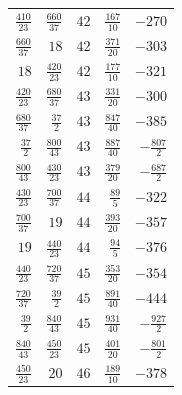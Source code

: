 {\begin{longtable}{@{\extracolsep{\fill}}rrrrr}
$\frac{410}{23}$ & $\frac{660}{37}$ & $42$ & $\frac{167}{10}$ & $-270$ \\
$\frac{660}{37}$ & $18$ & $42$ & $\frac{371}{20}$ & $-303$ \\
$18$ & $\frac{420}{23}$ & $42$ & $\frac{177}{10}$ & $-321$ \\
$\frac{420}{23}$ & $\frac{680}{37}$ & $43$ & $\frac{331}{20}$ & $-300$ \\
$\frac{680}{37}$ & $\frac{37}{2}$ & $43$ & $\frac{847}{40}$ & $-385$ \\
$\frac{37}{2}$ & $\frac{800}{43}$ & $43$ & $\frac{887}{40}$ & $-\frac{807}{2}$ \\
$\frac{800}{43}$ & $\frac{430}{23}$ & $43$ & $\frac{379}{20}$ & $-\frac{687}{2}$ \\
$\frac{430}{23}$ & $\frac{700}{37}$ & $44$ & $\frac{89}{5}$ & $-322$ \\
$\frac{700}{37}$ & $19$ & $44$ & $\frac{393}{20}$ & $-357$ \\
$19$ & $\frac{440}{23}$ & $44$ & $\frac{94}{5}$ & $-376$ \\
$\frac{440}{23}$ & $\frac{720}{37}$ & $45$ & $\frac{353}{20}$ & $-354$ \\
$\frac{720}{37}$ & $\frac{39}{2}$ & $45$ & $\frac{891}{40}$ & $-444$ \\
$\frac{39}{2}$ & $\frac{840}{43}$ & $45$ & $\frac{931}{40}$ & $-\frac{927}{2}$ \\
$\frac{840}{43}$ & $\frac{450}{23}$ & $45$ & $\frac{401}{20}$ & $-\frac{801}{2}$ \\
$\frac{450}{23}$ & $20$ & $46$ & $\frac{189}{10}$ & $-378$ \\
\end{longtable}
}
